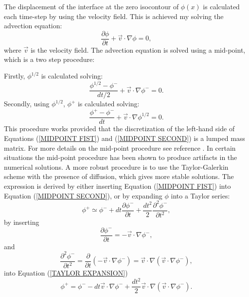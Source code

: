 The displacement of the interface at the zero isocontour of $\phi(x)$ is calculated each time-step by using the velocity field. This is achieved my solving the advection equation:
%
\begin{equation}
\frac{\partial \phi}{\partial t} + \vec{v} \cdot \nabla \phi = 0,
\label{ADVECTION}
\end{equation}
%
where $\vec{v}$ is the velocity field. The advection equation is solved using a mid-point, which is a two step procedure:

Firstly, $\phi^{1/2}$ is calculated solving:
%
\begin{equation}
\frac{\phi^{1/2} - \phi^{-}}{dt/2} + \vec{v} \cdot \nabla \phi^{-} = 0.
\label{MIDPOINT FIST}
\end{equation}
%
Secondly, using $\phi^{1/2}$, $\phi^{+}$ is calculated solving:
%
\begin{equation}
\frac{\phi^{+} - \phi^{-}}{dt} + \vec{v} \cdot \nabla \phi^{1/2} = 0.
\label{MIDPOINT SECOND}
\end{equation}
%
This procedure works provided that the discretization of the left-hand side of Equations (\ref{MIDPOINT FIST}) and (\ref{MIDPOINT SECOND}) is a lumped mass matrix. For more details on the mid-point procedure see reference \cite{BOURGOUIN2006}. In certain situations the mid-point procedure has been shown to produce artifacts in the numerical solutions. A more robust procedure is to use the Taylor-Galerkin scheme with the presence of diffusion, which gives more stable solutions. The expression is derived by either inserting Equation (\ref{MIDPOINT FIST}) into Equation (\ref{MIDPOINT SECOND}), or by expanding $\phi$ into a Taylor series:
%
\begin{equation}
\phi^{+} \simeq \phi^{-} + dt\frac{\partial \phi^{-}}{\partial t} + \frac{dt^2}{2}\frac{\partial^{2}\phi^{-}}{\partial t^{2}},
\label{TAYLOR EXPANSION}
\end{equation}
%
by inserting
%
\begin{equation}
\frac{\partial \phi^{-}}{\partial t} = - \vec{v} \cdot \nabla \phi^{-},
\label{INSERT ADVECTION}
\end{equation}
%
and
%
\begin{equation}
\frac{\partial^{2} \phi^{-}}{\partial t^{2}} = \frac{\partial}{\partial t}(-\vec{v} \cdot \nabla \phi^{-}) = \vec{v}\cdot \nabla (\vec{v}\cdot \nabla \phi^{-}),
\label{SECOND ORDER}
\end{equation}
%
into Equation (\ref{TAYLOR EXPANSION})
%
\begin{equation}
\phi^{+} = \phi^{-} - dt\vec{v}\cdot \nabla \phi^{-} + \frac{dt^2}{2}\vec{v}\cdot \nabla (\vec{v}\cdot \nabla \phi^{-}).
\label{TAYLOR GALERKIN}
\end{equation}


